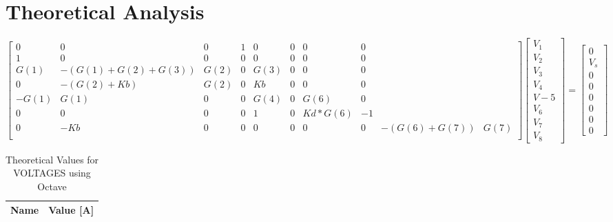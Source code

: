 \section{Theoretical Analysis}
\label{sec:analysis}










\begin{equation*}
\begin{bmatrix} 
 0 &      0 & 0 & 1 & 0 & 0 & 0 & 0 \\
1 &      0 & 0 & 0 & 0 & 0 & 0 & 0 \\
G(1) &   -(G(1)+G(2)+G(3)) &     G(2) &    0 &    G(3) &           0 &    0 &    0 \\
0 &      -(G(2)+Kb) &     G(2) &     0 &     Kb &           0 &    0 &    0 \\
-G(1) &    G(1) &   0 &       0 &     G(4)          & 0    & G(6)     & 0 \\
0 &        0 &     0 &    0 &  1 &    0 &    Kd*G(6) & -  1 \\
0 &       -Kb &   
0 &        0 &    0 &        0 &     0 &     0 &    -(G(6)+G(7)) &     G(7) \\
\end{bmatrix}
 \begin{bmatrix} V_1\\V_2\\V_3\\V_4\\V-5\\V_6\\V_7\\V_8 \end{bmatrix} = 
 \begin{bmatrix} 0\\V_s\\0\\0\\0\\0\\0\\0 \end{bmatrix}
\end{equation*}




\begin{table}[H]
  \centering
  \begin{tabular}{|l|r|}
    \hline
    {\bf Name} & {\bf Value [A]} \\ \hline
    
  \end{tabular}
  \caption{Theoretical Values for VOLTAGES using Octave}
  \label{tab:alinea1_voltagens_tab}
\end{table}

